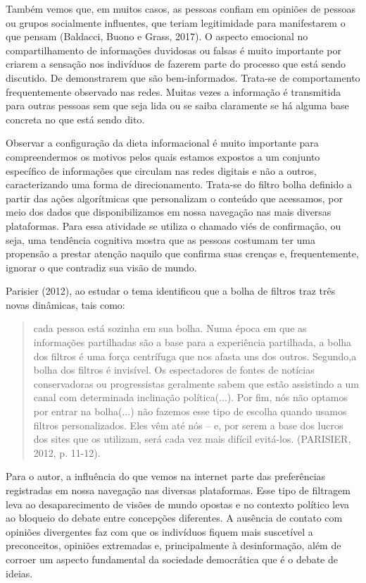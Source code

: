 Também vemos que, em muitos casos, as pessoas confiam em opiniões de
pessoas ou grupos socialmente influentes, que teriam legitimidade para
manifestarem o que pensam (Baldacci, Buono e Grass, 2017). O aspecto
emocional no compartilhamento de informações duvidosas ou falsas é muito
importante por criarem a sensação nos indivíduos de fazerem parte do
processo que está sendo discutido. De demonstrarem que são
bem-informados. Trata-se de comportamento frequentemente observado nas
redes. Muitas vezes a informação é transmitida para outras pessoas sem
que seja lida ou se saiba claramente se há alguma base concreta no que
está sendo dito.

Observar a configuração da dieta informacional é muito importante para
compreendermos os motivos pelos quais estamos expostos a um conjunto
específico de informações que circulam nas redes digitais e não a
outros, caracterizando uma forma de direcionamento. Trata-se do filtro
bolha definido a partir das ações algorítmicas que personalizam o
conteúdo que acessamos, por meio dos dados que disponibilizamos em nossa
navegação nas mais diversas plataformas. Para essa atividade se utiliza
o chamado viés de confirmação, ou seja, uma tendência cognitiva mostra
que as pessoas costumam ter uma propensão a prestar atenção naquilo que
confirma suas crenças e, frequentemente, ignorar o que contradiz sua
visão de mundo.

Parisier (2012), ao estudar o tema identificou que a bolha de filtros
traz três novas dinâmicas, tais como:

\begin{quote}
cada pessoa está sozinha em sua bolha. Numa época em que as informações
partilhadas são a base para a experiência partilhada, a bolha dos
filtros é uma força centrífuga que nos afasta uns dos outros. Segundo,a
bolha dos filtros é invisível. Os espectadores de fontes de notícias
conservadoras ou progressistas geralmente sabem que estão assistindo a
um canal com determinada inclinação política(...). Por fim, nós não
optamos por entrar na bolha(...) não fazemos esse tipo de escolha quando
usamos filtros personalizados. Eles vêm até nós -- e, por serem a base
dos lucros dos sites que os utilizam, será cada vez mais difícil
evitá-los. (PARISIER, 2012, p. 11-12).
\end{quote}

Para o autor, a influência do que vemos na internet parte das
preferências registradas em nossa navegação nas diversas plataformas.
Esse tipo de filtragem leva ao desaparecimento de visões de mundo
opostas e no contexto político leva ao bloqueio do debate entre
concepções diferentes. A ausência de contato com opiniões divergentes
faz com que os indivíduos fiquem mais suscetível a preconceitos,
opiniões extremadas e, principalmente à desinformação, além de corroer
um aspecto fundamental da sociedade democrática que é o debate de
ideias.

